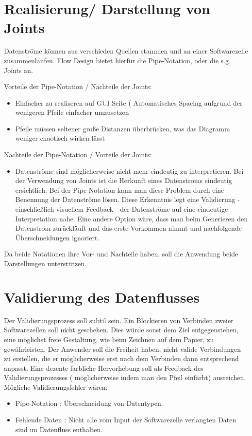 \documentclass[a4paper,12pt,oneside]{book}
\begin{document}
\section{Realisierung/ Darstellung von Joints}
\label{sec:orgheadline25}
Datenströme können aus verschieden Quellen stammen und an einer Softwarezelle
zusammenlaufen. Flow Design bietet hierfür die Pipe-Notation, oder die s.g. Joints
an. 

\bigskip

Vorteile der Pipe-Notation / Nachteile der Joints:

\begin{itemize}
\item Einfacher zu realiseren auf GUI Seite ( Automatisches Spacing aufgrund der
wenigeren Pfeile einfacher umzusetzen
\item Pfeile müssen seltener große Distanzen überbrücken, was das Diagramm weniger
chaotisch wirken lässt
\end{itemize}

Nachteile der Pipe-Notation / Vorteile der Joints:

\begin{itemize}
\item Datenströme sind möglicherweise nicht mehr eindeutig zu interpretieren. Bei
der Verwendung von Joints ist die Herkunft eines Datenstroms eindeutig
ersichtlich. Bei der Pipe-Notation kann man diese Problem durch eine Benennung
der Datenströme lösen. Diese Erkenntnis legt eine Validierung - einschließlich
visuellem Feedback - der Datenströme auf eine eindeutige Interpretation nahe.
Eine andere Option wäre, dass man beim Generieren den Datenstrom zurückläuft
und das erste Vorkommen nimmt und nachfolgende Überschneidungen ignoriert.
\end{itemize}

Da beide Notationen ihre Vor- und Nachteile haben, soll die Anwendung beide Darstellungen unterstützen.


\section{Validierung des Datenflusses}
\label{sec:orgheadline26}
Der Validierungsprozess soll subtil sein. Ein Blockieren von Verbinden zweier
Softwarezellen soll nicht geschehen. Dies würde sonst dem Ziel entgegenstehen, 
eine möglichst freie Gestaltung, wie beim Zeichnen auf dem Papier, zu
gewährleisten. Der Anwender soll die Freiheit haben, nicht valide Verbindungen
zu erstellen, die er möglicherweise erst nach dem Verbinden dann entsprechend
anpasst. Eine dezente farbliche Hervorhebung soll als Feedback des
Validierungsprozesses ( möglicherweise indem man den Pfeil einfärbt) ausreichen. Mögliche Validierungsfehler wären:
\begin{itemize}
\item Pipe-Notation : Überschneidung von Datentypen.
\item Fehlende Daten : Nicht alle vom Input der Softwarezelle verlangten Daten
sind im Datenfluss enthalten.
\end{itemize}
\end{document}
